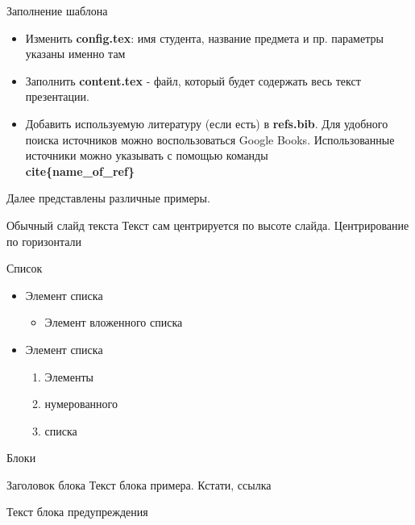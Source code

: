 \begin{frame}
	\titlepage
\end{frame}


\begin{frame}{Заполнение шаблона}
	\begin{itemize}
		\item Изменить \textbf{config.tex}: имя студента, название предмета и пр. параметры указаны именно там
		\item Заполнить \textbf{content.tex} - файл, который будет содержать весь текст презентации.
		\item Добавить используемую литературу (если есть) в \textbf{refs.bib}. Для удобного поиска источников можно воспользоваться Google Books. Использованные источники можно указывать с помощью команды \textbf{\\cite\{name\_of\_ref\}}
	\end{itemize}
	Далее представлены различные примеры.
\end{frame}

\begin{frame}{Обычный слайд текста}
	Текст сам центрируется по высоте слайда. Центрирование по горизонтали
\end{frame}


\begin{frame}{Список}
	\begin{itemize}
		\item Элемент списка
		      \begin{itemize}
			      \item Элемент вложенного списка
		      \end{itemize}
		\item Элемент списка
		      \begin{enumerate}
			      \item Элементы
			      \item нумерованного
			      \item списка
		      \end{enumerate}
	\end{itemize}
\end{frame}

\begin{frame}{Блоки}
	\begin{exampleblock}{Заголовок блока}
		Текст блока примера. Кстати, ссылка \cite{kingma2014adam}
	\end{exampleblock}

	\begin{alertblock}{}
		Текст блока предупреждения
	\end{alertblock}

\end{frame}

